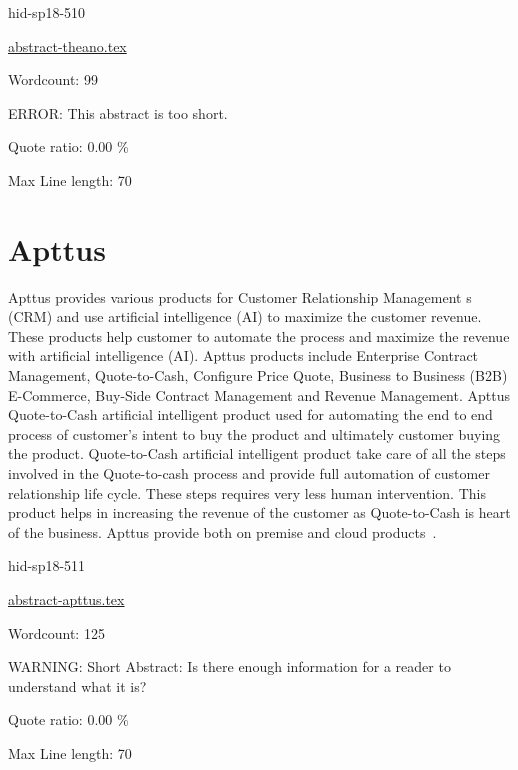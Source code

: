 \begin{IU}

hid-sp18-510

\href{https://github.com/cloudmesh-community/hid-sp18-510/blob/master//technology/abstract-theano.tex}{abstract-theano.tex}

 

Wordcount: 99

ERROR: This abstract is too short.


Quote ratio: 0.00 \%
 
Max Line length: 70
\end{IU}

\section{Apttus}

Apttus provides various products for Customer Relationship Management
s (CRM) and use artificial intelligence (AI) to maximize the customer
revenue. These products help customer to automate the process and
maximize the revenue with artificial intelligence (AI). Apttus
products include Enterprise Contract Management, Quote-to-Cash,
Configure Price Quote, Business to Business (B2B) E-Commerce, Buy-Side
Contract Management and Revenue Management. Apttus Quote-to-Cash
artificial intelligent product used for automating the end to end
process of customer's intent to buy the product and ultimately
customer buying the product. Quote-to-Cash artificial intelligent
product take care of all the steps involved in the Quote-to-cash
process and provide full automation of customer relationship life
cycle. These steps requires very less human intervention. This product
helps in increasing the revenue of the customer as Quote-to-Cash is
heart of the business. Apttus provide both on premise and cloud
products~\cite{hid-sp18-511-apttus}.
 


\begin{IU}

hid-sp18-511

\href{https://github.com/cloudmesh-community/hid-sp18-511/blob/master//technology/abstract-apttus.tex}{abstract-apttus.tex}

 

Wordcount: 125

WARNING: Short Abstract: Is there enough information for a reader to understand what it is?


Quote ratio: 0.00 \%
 
Max Line length: 70
\end{IU}

